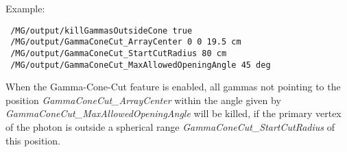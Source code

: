 Example:

\begin{lstlisting}
 /MG/output/killGammasOutsideCone true
 /MG/output/GammaConeCut_ArrayCenter 0 0 19.5 cm
 /MG/output/GammaConeCut_StartCutRadius 80 cm
 /MG/output/GammaConeCut_MaxAllowedOpeningAngle 45 deg
\end{lstlisting}

When the Gamma-Cone-Cut feature is enabled, all gammas not pointing to the position \textit{GammaConeCut\_ArrayCenter} within the angle 
given by \textit{GammaConeCut\_MaxAllowedOpeningAngle} will be killed, if the primary vertex of the photon 
is outside a spherical range \textit{GammaConeCut\_StartCutRadius} of this position.



